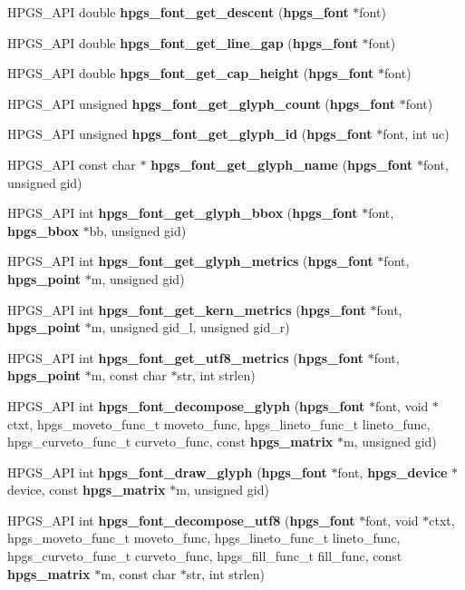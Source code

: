 \begin{DoxyCompactItemize}
\item 
HPGS\_\-API double {\bf hpgs\_\-font\_\-get\_\-descent} ({\bf hpgs\_\-font} $\ast$font)
\item 
HPGS\_\-API double {\bf hpgs\_\-font\_\-get\_\-line\_\-gap} ({\bf hpgs\_\-font} $\ast$font)
\item 
HPGS\_\-API double {\bf hpgs\_\-font\_\-get\_\-cap\_\-height} ({\bf hpgs\_\-font} $\ast$font)
\item 
HPGS\_\-API unsigned {\bf hpgs\_\-font\_\-get\_\-glyph\_\-count} ({\bf hpgs\_\-font} $\ast$font)
\item 
HPGS\_\-API unsigned {\bf hpgs\_\-font\_\-get\_\-glyph\_\-id} ({\bf hpgs\_\-font} $\ast$font, int uc)
\item 
HPGS\_\-API const char $\ast$ {\bf hpgs\_\-font\_\-get\_\-glyph\_\-name} ({\bf hpgs\_\-font} $\ast$font, unsigned gid)
\item 
HPGS\_\-API int {\bf hpgs\_\-font\_\-get\_\-glyph\_\-bbox} ({\bf hpgs\_\-font} $\ast$font, {\bf hpgs\_\-bbox} $\ast$bb, unsigned gid)
\item 
HPGS\_\-API int {\bf hpgs\_\-font\_\-get\_\-glyph\_\-metrics} ({\bf hpgs\_\-font} $\ast$font, {\bf hpgs\_\-point} $\ast$m, unsigned gid)
\item 
HPGS\_\-API int {\bf hpgs\_\-font\_\-get\_\-kern\_\-metrics} ({\bf hpgs\_\-font} $\ast$font, {\bf hpgs\_\-point} $\ast$m, unsigned gid\_\-l, unsigned gid\_\-r)
\item 
HPGS\_\-API int {\bf hpgs\_\-font\_\-get\_\-utf8\_\-metrics} ({\bf hpgs\_\-font} $\ast$font, {\bf hpgs\_\-point} $\ast$m, const char $\ast$str, int strlen)
\item 
HPGS\_\-API int {\bf hpgs\_\-font\_\-decompose\_\-glyph} ({\bf hpgs\_\-font} $\ast$font, void $\ast$ctxt, hpgs\_\-moveto\_\-func\_\-t moveto\_\-func, hpgs\_\-lineto\_\-func\_\-t lineto\_\-func, hpgs\_\-curveto\_\-func\_\-t curveto\_\-func, const {\bf hpgs\_\-matrix} $\ast$m, unsigned gid)
\item 
HPGS\_\-API int {\bf hpgs\_\-font\_\-draw\_\-glyph} ({\bf hpgs\_\-font} $\ast$font, {\bf hpgs\_\-device} $\ast$device, const {\bf hpgs\_\-matrix} $\ast$m, unsigned gid)
\item 
HPGS\_\-API int {\bf hpgs\_\-font\_\-decompose\_\-utf8} ({\bf hpgs\_\-font} $\ast$font, void $\ast$ctxt, hpgs\_\-moveto\_\-func\_\-t moveto\_\-func, hpgs\_\-lineto\_\-func\_\-t lineto\_\-func, hpgs\_\-curveto\_\-func\_\-t curveto\_\-func, hpgs\_\-fill\_\-func\_\-t fill\_\-func, const {\bf hpgs\_\-matrix} $\ast$m, const char $\ast$str, int strlen)
\item 

\end{DoxyCompactItemize}
